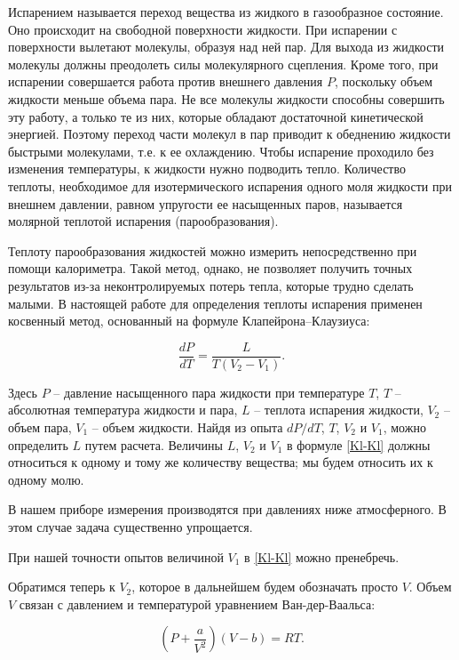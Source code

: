 \documentclass[a4paper,12pt]{article} %
\begin{document}
Испарением называется переход вещества из жидкого в газообразное состояние. Оно происходит на свободной поверхности жидкости. При испарении с поверхности вылетают молекулы, образуя над ней пар. Для выхода из жидкости молекулы должны преодолеть силы молекулярного сцепления. Кроме того, при испарении совершается работа против внешнего давления $ P $, поскольку объем жидкости меньше объема пара. Не все молекулы жидкости способны совершить эту работу, а только те из них, которые обладают достаточной кинетической энергией. Поэтому переход части молекул в пар приводит к обеднению жидкости быстрыми молекулами, т.е. к ее охлаждению. Чтобы испарение проходило без изменения температуры, к жидкости нужно подводить тепло. Количество теплоты, необходимое для изотермического испарения одного моля жидкости при внешнем давлении, равном упругости ее насыщенных паров, называется молярной теплотой испарения (парообразования).

Теплоту парообразования жидкостей можно измерить непосредственно при помощи калориметра. Такой метод, однако, не позволяет получить точных результатов из-за неконтролируемых потерь тепла, которые трудно сделать малыми. В настоящей работе для определения теплоты испарения применен косвенный метод, основанный на формуле Клапейрона–Клаузиуса:

\begin{equation}\label{Kl-Kl}
\frac{dP}{dT}=\frac{L}{T\left(V_2-V_1\right)}.
\end{equation}

Здесь $ P $ -- давление насыщенного пара жидкости при температуре $ T $, $ T $ -- абсолютная температура жидкости и пара, $ L $ -- теплота испарения жидкости, $ V_2 $ -- объем пара, $ V_1 $ -- объем жидкости. Найдя из опыта $ dP/dT $, $ T $, $ V_2 $ и $ V_1 $, можно определить $ L $ путем расчета. Величины $ L $, $ V_2 $ и $ V_1 $ в формуле \eqref{Kl-Kl} должны относиться к одному и тому же количеству вещества; мы будем относить их к одному молю.

В нашем приборе измерения производятся при давлениях ниже атмосферного. В этом случае задача существенно упрощается.

При нашей точности опытов величиной $ V_1 $ в \eqref{Kl-Kl} можно пренебречь.

Обратимся теперь к $ V_2 $, которое в дальнейшем будем обозначать просто $ V $. Объем $ V $ связан с давлением и температурой уравнением Ван-дер-Ваальса:

\begin{equation}\label{VDV}
\left(P+\frac{a}{V^2}\right)\left(V-b\right)=RT.
\end{equation}
\end{document}
